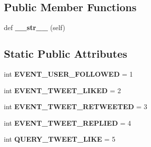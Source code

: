 \subsection*{Public Member Functions}
\begin{DoxyCompactItemize}
\item 
\mbox{\label{classtwitter_1_1bots_1_1messages__types_1_1BotToServer_a915f4adbd233145618c2deec2c13e4eb}} 
def {\bfseries \+\_\+\+\_\+str\+\_\+\+\_\+} (self)
\end{DoxyCompactItemize}
\subsection*{Static Public Attributes}
\begin{DoxyCompactItemize}
\item 
\mbox{\label{classtwitter_1_1bots_1_1messages__types_1_1BotToServer_abdaebceaf5179a32ed5319dc969326f0}} 
int {\bfseries E\+V\+E\+N\+T\+\_\+\+U\+S\+E\+R\+\_\+\+F\+O\+L\+L\+O\+W\+ED} = 1
\item 
\mbox{\label{classtwitter_1_1bots_1_1messages__types_1_1BotToServer_aaeaf2710b539578b584abe78ceed5031}} 
int {\bfseries E\+V\+E\+N\+T\+\_\+\+T\+W\+E\+E\+T\+\_\+\+L\+I\+K\+ED} = 2
\item 
\mbox{\label{classtwitter_1_1bots_1_1messages__types_1_1BotToServer_a6df7456bdd9985bbb9e801fceb7c3cee}} 
int {\bfseries E\+V\+E\+N\+T\+\_\+\+T\+W\+E\+E\+T\+\_\+\+R\+E\+T\+W\+E\+E\+T\+ED} = 3
\item 
\mbox{\label{classtwitter_1_1bots_1_1messages__types_1_1BotToServer_a1201f51b73028bd56c920863a93aaefa}} 
int {\bfseries E\+V\+E\+N\+T\+\_\+\+T\+W\+E\+E\+T\+\_\+\+R\+E\+P\+L\+I\+ED} = 4
\item 
\mbox{\label{classtwitter_1_1bots_1_1messages__types_1_1BotToServer_a3c73fb1a6f014c96ed8dca3c39c86572}} 
int {\bfseries Q\+U\+E\+R\+Y\+\_\+\+T\+W\+E\+E\+T\+\_\+\+L\+I\+KE} = 5
\item 

\end{DoxyCompactItemize}

